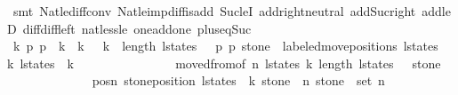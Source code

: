 \begin{isabellebody}
\ {\isacharparenleft}smt\ Nat{\isachardot}le{\isacharunderscore}diff{\isacharunderscore}conv{}\ Nat{\isachardot}le{\isacharunderscore}imp{\isacharunderscore}diff{\isacharunderscore}is{\isacharunderscore}add\ Suc{\isacharunderscore}leI\ add{\isachardot}right{\isacharunderscore}neutral\ add{\isacharunderscore}Suc{\isacharunderscore}right\ add{\isacharunderscore}leD{}\ diff{\isacharunderscore}diff{\isacharunderscore}left\ nat{\isacharunderscore}less{\isacharunderscore}le\ one{\isacharunderscore}add{\isacharunderscore}one\ plus{\isacharunderscore}{}{\isacharunderscore}eq{\isacharunderscore}Suc{\isacharparenright}\isanewline
\ \ \ \ \ \ \ \ \ \ \isamarkupfalse%
\ \isamarkupfalse%
\ k{\isacharprime}\ p{}{\isacharprime}{\isacharprime}\ p{}{\isacharprime}{\isacharprime}\ \ {\isachardoublequoteopen}k{\isacharprime}\ {\isasymge}\ k\ {\isacharplus}\ {}{\isachardoublequoteclose}\ {\isachardoublequoteopen}k{\isacharprime}\ {\isacharless}\ length\ l{\isacharunderscore}states\ {\isacharminus}\ {}{\isachardoublequoteclose}\ {\isachardoublequoteopen}{\isacharparenleft}p{}{\isacharprime}{\isacharprime}{\isacharcomma}\ p{}{\isacharprime}{\isacharprime}{\isacharcomma}\ stone{\isacharparenright}\ {\isacharequal}\ labeled{\isacharunderscore}move{\isacharunderscore}positions\ {\isacharparenleft}l{\isacharunderscore}states\ {\isacharbang}\ k{\isacharprime}{\isacharparenright}\ {\isacharparenleft}l{\isacharunderscore}states\ {\isacharbang}\ {\isacharparenleft}k{\isacharprime}\ {\isacharplus}\ {}{\isacharparenright}{\isacharparenright}{\isachardoublequoteclose}\isanewline
\ \ \ \ \ \ \ \ \ \ \ \ \isamarkupfalse%
\ moved{\isacharunderscore}from{\isacharbrackleft}of\ n\ l{\isacharunderscore}states\ {\isachardoublequoteopen}k{\isacharplus}{}{\isachardoublequoteclose}\ {\isachardoublequoteopen}length\ l{\isacharunderscore}states\ {\isacharminus}\ {}{\isachardoublequoteclose}\ stone{\isacharbrackright}\ \isanewline
\ \ \ \ \ \ \ \ \ \ \ \ \isamarkupfalse%
\ posn\ {\isacharbackquoteopen}stone{\isacharunderscore}position\ {\isacharparenleft}l{\isacharunderscore}states\ {\isacharbang}\ {\isacharparenleft}k{\isacharplus}{}{\isacharparenright}{\isacharparenright}\ stone\ {\isasymnoteq}\ n{\isacharbackquoteclose}\ {\isacharbackquoteopen}stone\ {\isasymin}\ set\ {\isacharbrackleft}{}{\isachardot}{\isachardot}{\isacharless}n{\isacharbrackright}{\isacharbackquoteclose}\isanewline

\end{isabellebody}
